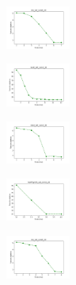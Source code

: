 \begin{figure}[H]
    \centering
    \begin{subfigure}
        \centering
        \includegraphics[width=0.234\textwidth]{img/es/iris_set_const_20_949004259_cost.png}
    \end{subfigure}
    \hfill
    \begin{subfigure}
        \centering
        \includegraphics[width=0.234\textwidth]{img/es/ecoli_set_const_20_949004259_cost.png}
    \end{subfigure}
    \hfill
    \begin{subfigure}
        \centering
        \includegraphics[width=0.234\textwidth]{img/es/rand_set_const_20_949004259_cost.png}
    \end{subfigure}
    \hfill
    \begin{subfigure}
        \centering
        \includegraphics[width=0.234\textwidth]{img/es/newthyroid_set_const_20_949004259_cost.png}
    \end{subfigure}
    \hfill
    \begin{subfigure}
        \centering
        \includegraphics[width=0.234\textwidth]{img/es/iris_set_const_20_589741062_cost.png}
    \end{subfigure}
    \hfill
    \begin{subfigure}

\end{subfigure}
\end{figure}
